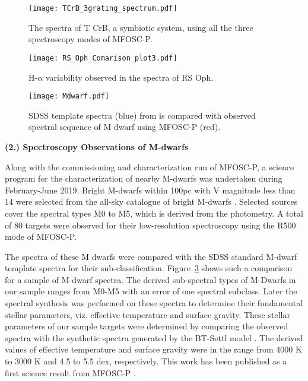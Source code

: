 
\begin{figure}
	\centering	
	\texttt{[image: TCrB\_3grating\_spectrum.pdf]}
	\vspace{0.2cm}
	\caption{The spectra of T CrB, a symbiotic system, using all the three spectroscopy modes of MFOSC-P.}
	\label{fig-TCrb}
\end{figure}


\begin{figure}
	\centering	
	\texttt{[image: RS\_Oph\_Comarison\_plot3.pdf]}
	\vspace{0.2cm}
	\caption{H-$\alpha$ variability observed in the spectra of RS Oph.}
	\label{fig-RSOph-HalphaProfile}
\end{figure}


\begin{figure}
	\centering
	\texttt{[image: Mdwarf.pdf]}
	\vspace{0.2cm}
	\caption{SDSS template spectra (blue) from \cite{Bochanski2007} is compared with observed spectral sequence of M dwarf using MFOSC-P (red).}
	
	\label{fig-MDwarfs}
\end{figure}


\par 
{\bf (2.) Spectroscopy Observations of M-dwarfs}\\
\par 
Along with the commissioning and characterization run of MFOSC-P, a science program for the characterization of nearby M-dwarfs was undertaken during February-June 2019. Bright M-dwarfs within 100pc with V magnitude less than 14 were selected from the all-sky catalogue of bright M-dwarfs \citep{Lepine2011}. Selected sources cover the spectral types M0 to M5, which is derived from the photometry. A total of 80 targets were observed for their low-resolution spectroscopy using the R500 mode of MFOSC-P. 
\par 
The spectra of these M dwarfs were compared with the SDSS standard M-dwarf template spectra for their sub-classification. Figure~\ref{fig-MDwarfs} shows such a comparison for a sample of M-dwarf spectra. The derived sub-spectral types of M-Dwarfs in our sample ranges from M0-M5 with an error of one spectral subclass. Later the spectral synthesis was performed on these spectra to determine their fundamental stellar parameters, viz. effective temperature and surface gravity. These stellar parameters of our sample targets were determined by comparing the observed spectra with the synthetic spectra generated by the BT-Settl model \citep{Allard2013}. The derived values of effective temperature and surface gravity were in the range from 4000 K to 3000 K and 4.5 to 5.5 dex, respectively. This work has been published as a first science result from MFOSC-P \citep{Rajpurohit2020}. \\


